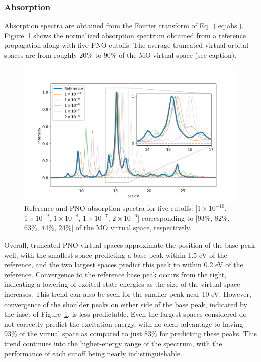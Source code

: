 \subsubsection{Absorption} \label{sss:abs}
Absorption spectra are obtained from the Fourier transform of Eq.~(\ref{eq:abs}).
Figure~\ref{fig:pno_abs} shows the normalized absorption spectrum obtained from
a reference propagation along with five PNO cutoffs. The average truncated virtual 
orbital spaces are from roughly 20\% to 90\% of the MO virtual space (see caption). 
\begin{figure} 
    \centering
    \includegraphics[scale=.6]{p3/figures/pno_abs.png}
    \caption{Reference and PNO absorption spectra for five cutoffs: 
    [$1\times 10^{-10}$, $1\times 10^{-9}$, $1\times 10^{-8}$, $1\times 10^{-7}$, 
    $2\times 10^{-6}$] corresponding to [$93\%$, $82\%$, $63\%$, $44\%$, $24\%$]
    of the MO virtual space, respectively.}
    \label{fig:pno_abs}
\end{figure}
Overall, truncated PNO virtual spaces approximate the position of the base peak well,
with the smallest space predicting a base peak within 1.5 eV of the reference,
and the two largest spaces predict this peak to within 0.2 eV of the reference.
Convergence to the reference base peak occurs from the right, indicating
a lowering of excited state energies as the size of the virtual space increases. 
This trend can also be seen for the smaller peak near 10 eV. However, convergence of the shoulder 
peaks on either side of the base peak, indicated by the inset of 
Figure~\ref{fig:pno_abs}, is less predictable. Even the largest spaces considered
do not correctly predict the excitation energy, with no clear advantage to having
93\% of the virtual space as compared to just 83\% for predicting these peaks.
This trend continues into the higher-energy range of the spectrum, with the 
performance of each cutoff being nearly indistinguishable. 

